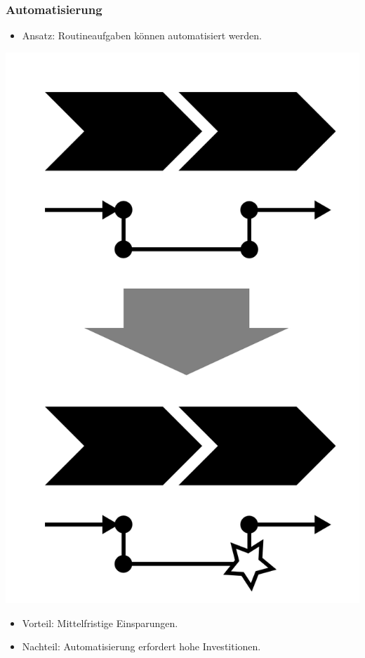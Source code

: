 \documentclass{beamer}
\begin{document}
 \begin{frame}
  \frametitle{Automatisierung}
  \begin{itemize}
    \item Ansatz: Routineaufgaben können automatisiert werden.
  \end{itemize}
  \centerline{\includegraphics[scale=2.5]{4_6_4.png}}
  \begin{itemize}
    \item Vorteil: Mittelfristige Einsparungen.
    \item Nachteil: Automatisierung erfordert hohe Investitionen.
  \end{itemize}
 \end{frame}
\end{document}
